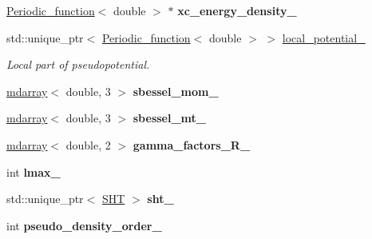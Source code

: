\begin{DoxyCompactItemize}
\item 
\hypertarget{classsirius_1_1_potential_ad1f6f7b2c1c85b230c34ba39e9fd9318}{}\hyperlink{classsirius_1_1_periodic__function}{Periodic\+\_\+function}$<$ double $>$ $\ast$ {\bfseries xc\+\_\+energy\+\_\+density\+\_\+}\label{classsirius_1_1_potential_ad1f6f7b2c1c85b230c34ba39e9fd9318}

\item 
std\+::unique\+\_\+ptr$<$ \hyperlink{classsirius_1_1_periodic__function}{Periodic\+\_\+function}$<$ double $>$ $>$ \hyperlink{classsirius_1_1_potential_a4071c9c5b14fd52005538e4de6e7943d}{local\+\_\+potential\+\_\+}
\begin{DoxyCompactList}\small\item\em Local part of pseudopotential. \end{DoxyCompactList}\item 
\hypertarget{classsirius_1_1_potential_ae1dc9c74958d3e7d11bbfbb1aa0bbb4b}{}\hyperlink{classsddk_1_1mdarray}{mdarray}$<$ double, 3 $>$ {\bfseries sbessel\+\_\+mom\+\_\+}\label{classsirius_1_1_potential_ae1dc9c74958d3e7d11bbfbb1aa0bbb4b}

\item 
\hypertarget{classsirius_1_1_potential_ab2d7e1a92fa0ce8754648315bb4acce3}{}\hyperlink{classsddk_1_1mdarray}{mdarray}$<$ double, 3 $>$ {\bfseries sbessel\+\_\+mt\+\_\+}\label{classsirius_1_1_potential_ab2d7e1a92fa0ce8754648315bb4acce3}

\item 
\hypertarget{classsirius_1_1_potential_a6095f630f2f5b843d901538a0f37f04e}{}\hyperlink{classsddk_1_1mdarray}{mdarray}$<$ double, 2 $>$ {\bfseries gamma\+\_\+factors\+\_\+\+R\+\_\+}\label{classsirius_1_1_potential_a6095f630f2f5b843d901538a0f37f04e}

\item 
\hypertarget{classsirius_1_1_potential_a7648173e3f1d0edc91d221c934b8e736}{}int {\bfseries lmax\+\_\+}\label{classsirius_1_1_potential_a7648173e3f1d0edc91d221c934b8e736}

\item 
\hypertarget{classsirius_1_1_potential_a75a43cb1413d564463a2895d691a959d}{}std\+::unique\+\_\+ptr$<$ \hyperlink{classsirius_1_1_s_h_t}{S\+H\+T} $>$ {\bfseries sht\+\_\+}\label{classsirius_1_1_potential_a75a43cb1413d564463a2895d691a959d}

\item 
\hypertarget{classsirius_1_1_potential_a781473e76bf903a5822000662c3b4414}{}int {\bfseries pseudo\+\_\+density\+\_\+order\+\_\+}\label{classsirius_1_1_potential_a781473e76bf903a5822000662c3b4414}


\end{DoxyCompactItemize}
